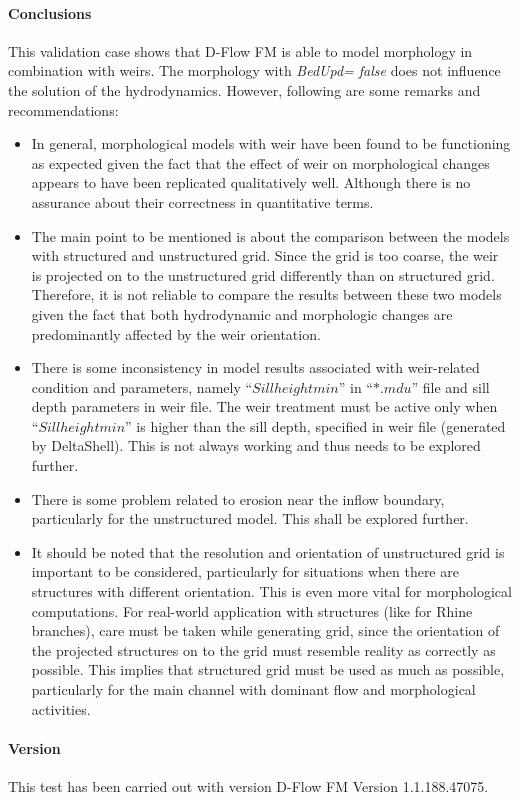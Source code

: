 \paragraph*{Conclusions}
This validation case shows that D-Flow FM is able to model morphology in combination with weirs. The morphology with \emph{BedUpd= false} does not influence the solution of the hydrodynamics.
However, following are some remarks and recommendations: 
\begin{itemize}
\item	In general, morphological models with weir have been found to be functioning as expected given the fact that the effect of weir on morphological changes appears to have been replicated qualitatively well. Although there is no assurance about their correctness in quantitative terms. 
\item	The main point to be mentioned is about the comparison between the models with structured and unstructured grid. Since the grid is too coarse, the weir is projected on to the unstructured grid differently than on structured grid. Therefore, it is not reliable to compare the results between these two models given the fact that both hydrodynamic and morphologic changes are predominantly affected by the weir orientation. 
\item	There is some inconsistency in model results associated with weir-related condition and parameters, namely $“Sillheightmin”$ in $“*.mdu”$ file and sill depth parameters in weir file. The weir treatment must be active only when $“Sillheightmin”$ is higher than the sill depth, specified in weir file (generated by DeltaShell). This is not always working and thus needs to be explored further. 
\item	There is some problem related to erosion near the inflow boundary, particularly for the unstructured model. This shall be explored further.  
\item	It should be noted that the resolution and orientation of unstructured grid is important to be considered, particularly for situations when there are structures with different orientation. This is even more vital for morphological computations. For real-world application with structures (like for Rhine branches), care must be taken while generating grid, since the orientation of the projected structures on to the grid must resemble reality as correctly as possible. This implies that structured grid must be used as much as possible, particularly for the main channel with dominant flow and morphological activities. 
\end{itemize}

\paragraph*{Version}
This test has been carried out with version D-Flow FM Version 1.1.188.47075.